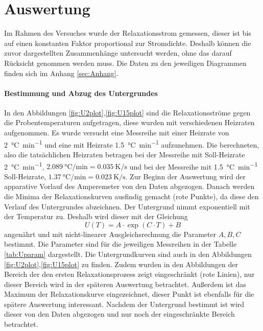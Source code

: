 \section{Auswertung} \label{sec:Auswertung}
Im Rahmen des Versuches wurde der Relaxationsstrom gemessen, dieser ist bis auf einen konstanten 
Faktor proportional zur Stromdichte.
Deshalb können die zuvor dargestellten Zusammenhänge untersucht werden,
ohne das darauf Rücksicht genommen werden muss.
Die Daten zu den jeweiligen Diagrammen finden sich im Anhang \ref{sec:Anhang}.
\paragraph{Bestimmung und Abzug des Untergrundes}
In den Abbildungen \ref{fig:U2plot},\ref{fig:U15plot} sind die Relaxationsströme gegen die
Probentemperaturen aufgetragen, diese wurden mit verschiedenen Heizraten aufgenommen.
Es wurde versucht eine Messreihe mit einer Heizrate von \SI{2}{\celsius\per\minute} und eine
mit Heizrate \SI{1.5}{\celsius\per\minute} aufzunehmen.
Die berechneten, also die tatsächlichen Heizraten betragen
bei der Messreihe mit Soll-Heizrate \SI{2}{\celsius\per\minute},
$\SI{2.089}{\celsius\per\minute} = \SI{0.035}{\kelvin\per\second}$ und bei der
Messreihe mit \SI{1.5}{\celsius\per\minute} Soll-Heizrate,
$\SI{1.37}{\celsius\per\minute} = \SI{0.023}{\kelvin\per\second}$.
Zur Beginn der Auswertung wird der apparative Vorlauf des
Amperemeter von den Daten abgezogen. Danach werden die Minima der Relaxationskurven ausfindig
gemacht (rote Punkte),
da diese den Verlauf des Untergrundes abzeichnen. Der Untergrund nimmt exponentiell mit
der Temperatur zu. Deshalb wird dieser mit der Gleichung
\begin{equation}
U(T) = 	A\cdot \exp (C\cdot T ) + B
\end{equation}
angenährt und mit nicht-linearer Ausgleichsrechnung die Parameter $A,B,C$ bestimmt.
Die Parameter sind für die jeweiligen Messreihen in der Tabelle \ref{tab:Uparam} dargestellt.
Die Untergrundkurven sind auch in den Abbildungen \ref{fig:U2plot},\ref{fig:U15plot} zu finden.
Zudem wurden in den Abbildungen der Bereich der den ersten Relaxationsprozess zeigt eingeschränkt
(rote Linien), nur dieser Bereich wird in der späteren Auswertung betrachtet.
Außerdem ist das Maximum der
Relaxationskurve eingezeichnet, dieser Punkt ist ebenfalls für die spätere Auswertung interessant.
Nachdem der Untergrund bestimmt ist wird dieser von den Daten abgezogen und nur noch der
eingeschränkte Bereich betrachtet.

